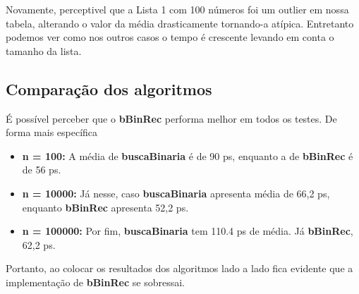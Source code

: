 Novamente, perceptivel que a Lista 1 com 100 números foi um outlier em nossa tabela, alterando o valor da média drasticamente tornando-a atípica. Entretanto podemos ver como nos outros casos o tempo é crescente levando em conta o tamanho da lista.

\subsection{Comparação dos algoritmos}

É possível perceber que o \textbf{bBinRec} performa melhor em todos os testes. De forma mais específica

\begin{itemize}
  \item \textbf{n = 100:} A média de \textbf{buscaBinaria} é de 90 ps, enquanto a de \textbf{bBinRec} é de 56 ps.

  \item \textbf{n = 10000:} Já nesse, caso \textbf{buscaBinaria} apresenta média de 66,2 ps, enquanto \textbf{bBinRec} apresenta 52,2 ps.

  \item \textbf{n = 100000:} Por fim, \textbf{buscaBinaria} tem 110.4 ps de média. Já \textbf{bBinRec}, 62,2 ps.
\end{itemize}

Portanto, ao colocar os resultados dos algoritmos lado a lado fica evidente que a implementação de \textbf{bBinRec} se sobressai.
\newpage
